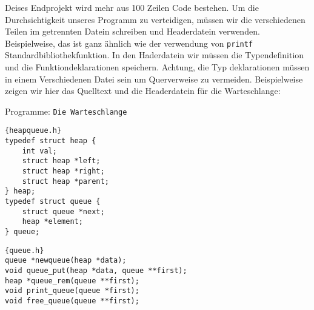 Deises Endprojekt wird mehr aus 100 Zeilen Code bestehen.
Um die Durchsichtigkeit unseres Programm zu verteidigen, müssen
wir die verschiedenen Teilen im getrennten Datein schreiben und
Headerdatein verwenden. Beispielweise, das ist ganz ähnlich wie der 
verwendung von \texttt{printf} Standardbibliothekfunktion. In den Haderdatein
wir müssen die Typendefinition und die Funktiondeklarationen speichern. Achtung, 
die Typ deklarationen müssen in einem Verschiedenen Datei sein um Querverweise zu vermeiden.
Beispielweise zeigen wir hier das Quelltext und die Headerdatein für die Warteschlange:

\begin{myexampleprogram}{ Programme: \texttt{Die Warteschlange}}	
\begin{lstlisting}{heapqueue.h}
typedef struct heap {
    int val;
    struct heap *left;
    struct heap *right;
    struct heap *parent;
} heap;
typedef struct queue {
    struct queue *next;
    heap *element;
} queue;
\end{lstlisting}
\begin{lstlisting}{queue.h}
queue *newqueue(heap *data);
void queue_put(heap *data, queue **first);
heap *queue_rem(queue **first);
void print_queue(queue *first);
void free_queue(queue **first);
\end{lstlisting}


\end{myexampleprogram}
